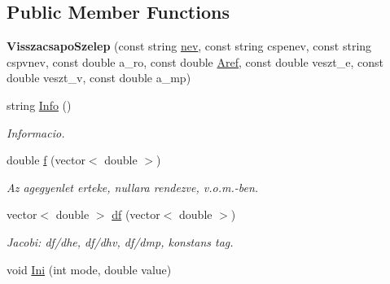 \subsection*{Public Member Functions}
\begin{DoxyCompactItemize}
\item 
\mbox{\label{class_visszacsapo_szelep_a40da5edbf8243f70eedb5891a0cd6b19}} 
{\bfseries Visszacsapo\+Szelep} (const string \hyperlink{class_agelem_abe92b7e3912367d5d1caf6b277ca0b7d}{nev}, const string cspenev, const string cspvnev, const double a\+\_\+ro, const double \hyperlink{class_agelem_a3f8668febc2958fd539997d537552f17}{Aref}, const double veszt\+\_\+e, const double veszt\+\_\+v, const double a\+\_\+mp)
\item 
\mbox{\label{class_visszacsapo_szelep_ae4304110869247cb1d1428c366553665}} 
string \hyperlink{class_visszacsapo_szelep_ae4304110869247cb1d1428c366553665}{Info} ()
\begin{DoxyCompactList}\small\item\em Informacio. \end{DoxyCompactList}\item 
\mbox{\label{class_visszacsapo_szelep_aa148976fb3ca2ab3d35c255dcc83c947}} 
double \hyperlink{class_visszacsapo_szelep_aa148976fb3ca2ab3d35c255dcc83c947}{f} (vector$<$ double $>$)
\begin{DoxyCompactList}\small\item\em Az agegyenlet erteke, nullara rendezve, v.\+o.\+m.-\/ben. \end{DoxyCompactList}\item 
\mbox{\label{class_visszacsapo_szelep_a9925c2e8f958d4d5707dd563f9d3ff31}} 
vector$<$ double $>$ \hyperlink{class_visszacsapo_szelep_a9925c2e8f958d4d5707dd563f9d3ff31}{df} (vector$<$ double $>$)
\begin{DoxyCompactList}\small\item\em Jacobi\+: df/dhe, df/dhv, df/dmp, konstans tag. \end{DoxyCompactList}\item 
\mbox{\label{class_visszacsapo_szelep_a3473fbea667f172b09beae228c730e4f}} 
void \hyperlink{class_visszacsapo_szelep_a3473fbea667f172b09beae228c730e4f}{Ini} (int mode, double value)

\end{DoxyCompactItemize}
